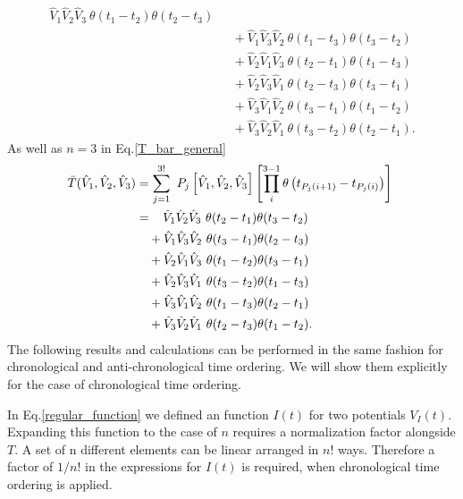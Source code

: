 \documentclass[
11pt, %
english, %
singlespacing, %
headsepline, %
]{MastersDoctoralThesis} %
\begin{document}
\begin{subappendices}
\begin{equation}
\begin{split}
\hat{V}_{1}\hat{V}_{2}\hat{V}_{3}\  \theta(t_{1}-t_{2}) \theta(t_{2}-t_{3})
	\\
	& \ \ \ +\hat{V}_{1}\hat{V}_{3}\hat{V}_{2}\   \theta(t_{1}-t_{3})\theta(t_{3}-t_{2})
	\\
	& \ \ \ +\hat{V}_{2}\hat{V}_{1}\hat{V}_{3} \  \theta(t_{2}-t_{1})\theta(t_{1}-t_{3})
	\\
	& \ \ \ +\hat{V}_{2}\hat{V}_{3}\hat{V}_{1}\   \theta(t_{2}-t_{3})\theta(t_{3}-t_{1})
	\\
	& \ \ \ +\hat{V}_{3}\hat{V}_{1}\hat{V}_{2}\   \theta(t_{3}-t_{1})\theta(t_{1}-t_{2})
	\\
	& \ \ \ +\hat{V}_{3}\hat{V}_{2}\hat{V}_{1}\  \theta(t_{3}-t_{2})\theta(t_{2}-t_{1}).
\end{split}
\end{equation}
As well as $ n=3 $ in Eq.\enskip\eqref{T_bar_general}
\begin{equation}
\begin{split}
\bar{T}(\hat{V}_1, \hat{V}_2,\hat{V}_3)
&=
\sum_{j=1}^{3!}\ P_{j}
\left[
\hat{V}_1, \hat{V}_2,\hat{V}_3
 \right]  
\left[
\prod^{3-1}_{i}
\theta
	\left(
	t_{P_{j}(i+1)}-t_{P_{j}(i)}
	\right)
\right]\
\\
&=\enspace\thinspace\thinspace
\hat{V}_{1}\hat{V}_{2}\hat{V}_{3}\  \theta(t_2 -t_1)\theta(t_3 -t_2)
	\\
	& \ \ \ +\hat{V}_{1}\hat{V}_{3}\hat{V}_{2}\   \theta(t_3 -t_1)\theta(t_2 -t_3)
	\\
	& \ \ \ +\hat{V}_{2}\hat{V}_{1}\hat{V}_{3}\  \theta(t_1 -t_2)\theta(t_3 -t_1)
	\\
	& \ \ \ +\hat{V}_{2}\hat{V}_{3}\hat{V}_{1}\   \theta(t_3 -t_2)\theta(t_1 -t_3)
	\\
	& \ \ \ +\hat{V}_{3}\hat{V}_{1}\hat{V}_{2} \  \theta(t_1 -t_3)\theta(t_2 -t_1)
	\\
	& \ \ \ +\hat{V}_{3}\hat{V}_{2}\hat{V}_{1} \  \theta(t_2 -t_3)\theta(t_1 -t_2)
.
\end{split}
\end{equation}
The following results and calculations can be performed in the same fashion for chronological and anti-chronological time ordering. We will show them explicitly for the case of chronological time ordering.

In Eq.\enskip\eqref{regular_function} we defined an function $ I(t)$ for two potentials $ V_I(t) $. Expanding this function to the case of $ n $ requires a normalization factor alongside $ T $. A set of n different elements can be linear arranged in $ n! $ ways. Therefore a factor of $ 1/{n!} $ in the expressions for $ I(t)$ is required, when chronological time ordering is applied.  


\end{subappendices}
\end{document}
